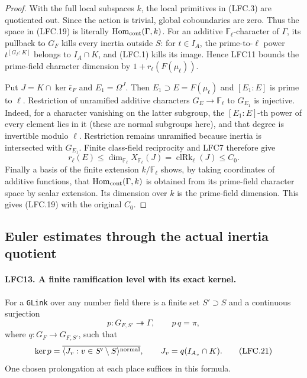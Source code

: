 \documentclass[11pt,a4paper]{article}
\numberwithin{equation}{section}
\theoremstyle{remark}\newtheorem{remark}[theorem]{Remark}
\begin{document}
\begin{proof}
With the full local subspaces \(k\), the local primitives
in (LFC.3) are quotiented out.  Since the action is trivial,
global coboundaries are zero.  Thus the space in (LFC.19)
is literally \(\operatorname{Hom}_{\rm cont}(\Gamma,k)\).
For an additive \(\mathbb F_\ell\)-character of \(\Gamma\),
its pullback to \(G_F\) kills every inertia outside \(S\):
for \(t\in I_A\), the prime-to-\(\ell\) power
\(t^{[G_F:K]}\) belongs to \(I_A\cap K\), and (LFC.1)
kills its image.  Hence LFC11 bounds the prime-field
character dimension by \(1+r_\ell(F(\mu_\ell))\).

Put \(J=K\cap\ker\bar\epsilon_F\) and \(E_1=\Omega^J\).
Then \(E_1\supset E=F(\mu_\ell)\) and \([E_1:E]\)
is prime to \(\ell\).
Restriction of unramified additive characters
\(G_E\to\mathbb F_\ell\) to \(G_{E_1}\) is injective.
Indeed, for a character vanishing on the latter subgroup,
the \([E_1:E]\)-th power of every element lies in it
(these are normal subgroups here), and that degree is
invertible modulo \(\ell\).
Restriction remains unramified because inertia is
intersected with \(G_{E_1}\).
Finite class-field reciprocity and LFC7 therefore give
\[
 r_\ell(E)\le\dim_{\mathbb F_\ell}X_{\mathbb F_\ell}(J)
             =\operatorname{clRk}_\ell(J)\le C_0.
 \]
Finally a basis of the finite extension \(k/\mathbb F_\ell\)
shows, by taking coordinates of additive functions, that
\(\operatorname{Hom}_{\rm cont}(\Gamma,k)\) is obtained
from its prime-field character space by scalar extension.
Its dimension over \(k\) is the prime-field dimension.
This gives (LFC.19) with the original \(C_0\).
\end{proof}

\subsection{Euler estimates through the actual inertia quotient}

\paragraph{LFC13. A finite ramification level with its exact kernel.}
\label{claim:LFC13}
For a \texttt{GLink} over any number field there is a
finite set \(S'\supset S\)
and a continuous surjection
\[
 p:G_{F,S'}\twoheadrightarrow\Gamma,\qquad p\,q=\pi,
                                                        \tag{LFC.20}
\]
where \(q:G_F\to G_{F,S'}\), such that
\[
 \ker p=\overline{\langle J_v:v\in S'\setminus S
                                      \rangle^{\rm normal}},
 \qquad J_v=q(I_{A_v}\cap K).                            \tag{LFC.21}
\]
One chosen prolongation at each place suffices in this formula.
\end{document}
